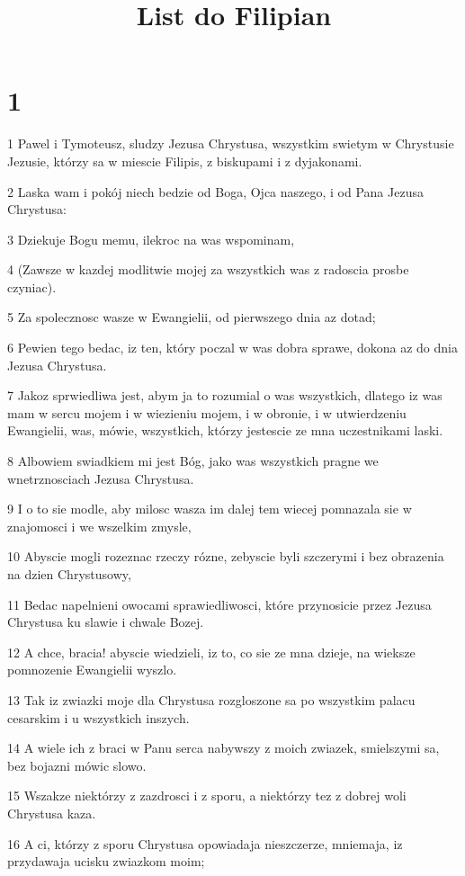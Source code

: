 

\title{List do Filipian}


\chapter{1}

\par 1 Pawel i Tymoteusz, sludzy Jezusa Chrystusa, wszystkim swietym w Chrystusie Jezusie, którzy sa w miescie Filipis, z biskupami i z dyjakonami.
\par 2 Laska wam i pokój niech bedzie od Boga, Ojca naszego, i od Pana Jezusa Chrystusa:
\par 3 Dziekuje Bogu memu, ilekroc na was wspominam,
\par 4 (Zawsze w kazdej modlitwie mojej za wszystkich was z radoscia prosbe czyniac).
\par 5 Za spolecznosc wasze w Ewangielii, od pierwszego dnia az dotad;
\par 6 Pewien tego bedac, iz ten, który poczal w was dobra sprawe, dokona az do dnia Jezusa Chrystusa.
\par 7 Jakoz sprwiedliwa jest, abym ja to rozumial o was wszystkich, dlatego iz was mam w sercu mojem i w wiezieniu mojem, i w obronie, i w utwierdzeniu Ewangielii, was, mówie, wszystkich, którzy jestescie ze mna uczestnikami laski.
\par 8 Albowiem swiadkiem mi jest Bóg, jako was wszystkich pragne we wnetrznosciach Jezusa Chrystusa.
\par 9 I o to sie modle, aby milosc wasza im dalej tem wiecej pomnazala sie w znajomosci i we wszelkim zmysle,
\par 10 Abyscie mogli rozeznac rzeczy rózne, zebyscie byli szczerymi i bez obrazenia na dzien Chrystusowy,
\par 11 Bedac napelnieni owocami sprawiedliwosci, które przynosicie przez Jezusa Chrystusa ku slawie i chwale Bozej.
\par 12 A chce, bracia! abyscie wiedzieli, iz to, co sie ze mna dzieje, na wieksze pomnozenie Ewangielii wyszlo.
\par 13 Tak iz zwiazki moje dla Chrystusa rozgloszone sa po wszystkim palacu cesarskim i u wszystkich inszych.
\par 14 A wiele ich z braci w Panu serca nabywszy z moich zwiazek, smielszymi sa, bez bojazni mówic slowo.
\par 15 Wszakze niektórzy z zazdrosci i z sporu, a niektórzy tez z dobrej woli Chrystusa kaza.
\par 16 A ci, którzy z sporu Chrystusa opowiadaja nieszczerze, mniemaja, iz przydawaja ucisku zwiazkom moim;
